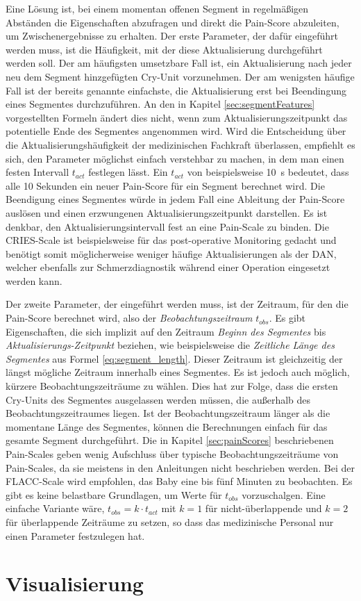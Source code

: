 Eine Lösung ist, bei einem momentan offenen Segment in regelmäßigen Abständen die Eigenschaften abzufragen und direkt die Pain-Score abzuleiten, um Zwischenergebnisse zu erhalten. Der erste Parameter, der dafür eingeführt werden muss, ist die Häufigkeit, mit der diese \glqq Aktualisierung\grqq{} durchgeführt werden soll. Der am häufigsten umsetzbare Fall ist, ein Aktualisierung nach jeder neu dem Segment hinzgefügten Cry-Unit vorzunehmen. Der am wenigsten häufige Fall ist der bereits genannte einfachste, die Aktualisierung erst bei Beendingung eines Segmentes durchzuführen. An den in Kapitel \ref{sec:segmentFeatures} vorgestellten Formeln ändert dies nicht, wenn zum Aktualisierungszeitpunkt das potentielle Ende des Segmentes angenommen wird. Wird die Entscheidung über die Aktualisierungshäufigkeit der medizinischen Fachkraft überlassen, empfiehlt es sich, den Parameter möglichst einfach verstehbar zu machen, in dem man einen festen Intervall $t_{act}$ festlegen lässt. Ein $t_{act}$ von beispielsweise \SI{10}{\second} bedeutet, dass alle 10 Sekunden ein neuer Pain-Score für ein Segment berechnet wird. Die Beendigung eines Segmentes würde in jedem Fall eine Ableitung der Pain-Score auslösen und einen \glqq erzwungenen Aktualisierungszeitpunkt\grqq{} darstellen. Es ist denkbar, den Aktualisierungsintervall fest an eine Pain-Scale zu binden. Die CRIES-Scale ist beispielsweise für das post-operative Monitoring gedacht und benötigt somit möglicherweise weniger häufige Aktualisierungen als der DAN, welcher ebenfalls zur Schmerzdiagnostik während einer Operation eingesetzt werden kann. \cite[S. 98]{painInNeonates}

Der zweite Parameter, der eingeführt werden muss, ist der Zeitraum, für den die Pain-Score berechnet wird, also der \emph{Beobachtungszeitraum} $t_{obs}$. Es gibt Eigenschaften, die sich implizit auf den Zeitraum \emph{Beginn des Segmentes} bis \emph{Aktualisierungs-Zeitpunkt} beziehen, wie beispielsweise die \emph{Zeitliche Länge des Segmentes} aus Formel \ref{eq:segment_length}. Dieser Zeitraum ist gleichzeitig der längst mögliche Zeitraum innerhalb eines Segmentes. Es ist jedoch auch möglich, kürzere Beobachtungszeiträume zu wählen. Dies hat zur Folge, dass die ersten Cry-Units des Segmentes ausgelassen werden müssen, die außerhalb des Beobachtungszeitraumes liegen. Ist der Beobachtungszeitraum länger als die momentane Länge des Segmentes, können die Berechnungen einfach für das gesamte Segment durchgeführt. Die in Kapitel \ref{sec:painScores} beschriebenen Pain-Scales geben wenig Aufschluss über \glqq typische Beobachtungszeiträume von Pain-Scales\grqq{}, da sie meistens in den Anleitungen nicht beschrieben werden. Bei der FLACC-Scale wird empfohlen, das Baby eine bis fünf Minuten zu beobachten.\cite{flacc} Es gibt es keine belastbare Grundlagen, um Werte für $t_{obs}$ vorzuschalgen. Eine einfache Variante wäre, $t_{obs} = k \cdot t_{act}$ mit $k=1$ für nicht-überlappende und $k=2$ für überlappende Zeiträume zu setzen, so dass das medizinische Personal nur einen Parameter festzulegen hat.

\section{Visualisierung}
\label{sec:visualisation}